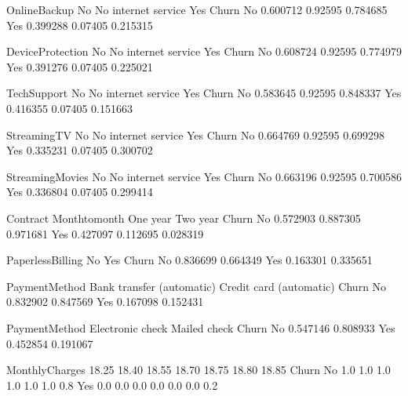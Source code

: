 \documentclass[letterpaper,10pt,english]{jupyterBook}
\begin{document}
\begin{sphinxVerbatim}[commandchars=\\\{\}]
OnlineBackup        No  No internet service       Yes
Churn                                                
No            0.600712              0.92595  0.784685
Yes           0.399288              0.07405  0.215315

DeviceProtection        No  No internet service       Yes
Churn                                                    
No                0.608724              0.92595  0.774979
Yes               0.391276              0.07405  0.225021

TechSupport        No  No internet service       Yes
Churn                                               
No           0.583645              0.92595  0.848337
Yes          0.416355              0.07405  0.151663

StreamingTV        No  No internet service       Yes
Churn                                               
No           0.664769              0.92595  0.699298
Yes          0.335231              0.07405  0.300702

StreamingMovies        No  No internet service       Yes
Churn                                                   
No               0.663196              0.92595  0.700586
Yes              0.336804              0.07405  0.299414

Contract  Month\PYGZhy{}to\PYGZhy{}month  One year  Two year
Churn                                       
No              0.572903  0.887305  0.971681
Yes             0.427097  0.112695  0.028319

PaperlessBilling        No       Yes
Churn                               
No                0.836699  0.664349
Yes               0.163301  0.335651

PaymentMethod  Bank transfer (automatic)  Credit card (automatic)  \PYGZbs{}
Churn                                                               
No                              0.832902                 0.847569   
Yes                             0.167098                 0.152431   

PaymentMethod  Electronic check  Mailed check  
Churn                                          
No                     0.547146      0.808933  
Yes                    0.452854      0.191067  

MonthlyCharges  18.25   18.40   18.55   18.70   18.75   18.80   18.85   \PYGZbs{}
Churn                                                                    
No                 1.0     1.0     1.0     1.0     1.0     1.0     0.8   
Yes                0.0     0.0     0.0     0.0     0.0     0.0     0.2   


\end{sphinxVerbatim}
\end{document}
